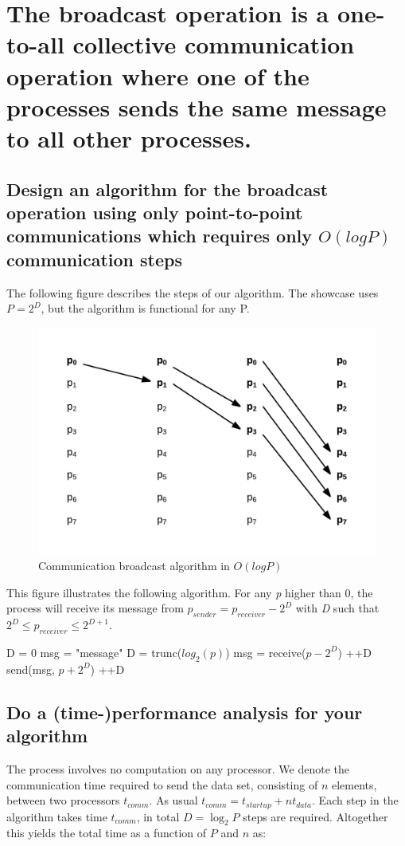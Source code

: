 \section{The broadcast operation is a one-to-all collective communication operation where
one of the processes sends the same message to all other processes.}
\subsection{Design an algorithm for the broadcast operation using only point-to-point communications which requires only $O(log P)$ communication steps}
The following figure describes the steps of our algorithm. The showcase uses $P = 2^D$, but the algorithm is functional for any P.
\begin{figure}[H]
\centering
\includegraphics[width=0.7\linewidth]{img/communication_propagation.png}
\caption{Communication broadcast algorithm in $O(log P)$}
\end{figure}

This figure illustrates the following algorithm. For any \textit{p} higher than 0, the process will receive its message from $p_{sender} = p_{receiver} - 2^D$ with \textit{D} such that $2^D \leq p_{receiver} \leq 2^{D+1} $.

\begin{algorithmic}
    \State D = 0
    \State msg = "message"
\Else
    \State D = trunc($log_2(p)$)
    \State msg = receive($p - 2^D$)
    \State ++D
\EndIf
\State 
{}
    \State send(msg, $p + 2^D$)
    \State ++D
\EndWhile
\end{algorithmic}


\subsection{Do a (time-)performance analysis for your algorithm}
The process involves no computation on any processor. We denote the communication time required to send the data set, consisting of $n$ elements, between two processors $t_{comm}$. As usual $t_{comm} =t_{startup}+nt_{data}$. Each step in the algorithm takes time $t_{comm}$, in total $D=\log_2{P}$ steps are required. Altogether this yields the total time as a function of $P$ and $n$ as: 

